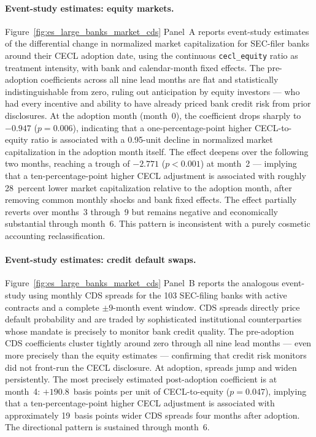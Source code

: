 \paragraph{Event-study estimates: equity markets.}
Figure~\ref{fig:es_large_banks_market_cds} Panel~A reports event-study
estimates of the differential change in normalized market capitalization for
SEC-filer banks around their CECL adoption date, using the continuous
\texttt{cecl\_equity} ratio as treatment intensity, with bank and
calendar-month fixed effects.  The pre-adoption coefficients across all nine
lead months are flat and statistically indistinguishable from zero, ruling out
anticipation by equity investors --- who had every incentive and ability to have
already priced bank credit risk from prior disclosures.  At the adoption month
(month~0), the coefficient drops sharply to $-0.947$ ($p = 0.006$), indicating
that a one-percentage-point higher CECL-to-equity ratio is associated with a
0.95-unit decline in normalized market capitalization in the adoption month
itself.  The effect deepens over the following two months, reaching a trough of
$-2.771$ ($p < 0.001$) at month~2 --- implying that a ten-percentage-point
higher CECL adjustment is associated with roughly 28~percent lower market
capitalization relative to the adoption month, after removing common monthly
shocks and bank fixed effects.  The effect partially reverts over months~3
through~9 but remains negative and economically substantial through month~6.
This pattern is inconsistent with a purely cosmetic accounting reclassification.

\paragraph{Event-study estimates: credit default swaps.}
Figure~\ref{fig:es_large_banks_market_cds} Panel~B reports the analogous
event-study using monthly CDS spreads for the 103 SEC-filing banks with active
contracts and a complete $\pm 9$-month event window.  CDS spreads directly
price default probability and are traded by sophisticated institutional
counterparties whose mandate is precisely to monitor bank credit quality.
The pre-adoption CDS coefficients cluster tightly around zero through all nine
lead months --- even more precisely than the equity estimates --- confirming
that credit risk monitors did not front-run the CECL disclosure.  At adoption,
spreads jump and widen persistently.  The most precisely estimated post-adoption
coefficient is at month~4: $+190.8$~basis points per unit of CECL-to-equity
($p = 0.047$), implying that a ten-percentage-point higher CECL adjustment is
associated with approximately 19~basis points wider CDS spreads four months
after adoption.  The directional pattern is sustained through month~6.

